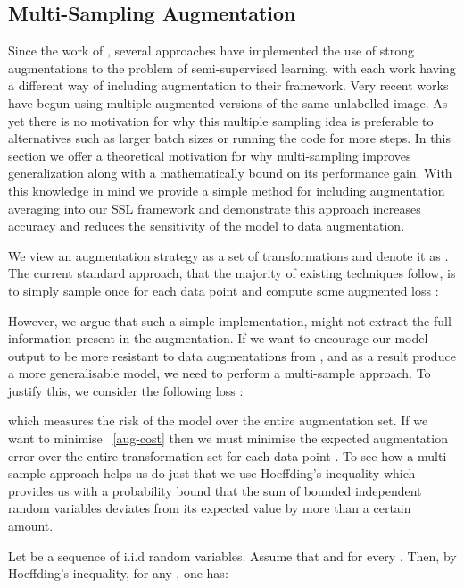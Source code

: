 \documentclass[journal]{IEEEtran}
\begin{document}
\subsection{Multi-Sampling Augmentation}
Since the work of \cite{xie2019unsupervised}, several approaches have implemented the use of strong augmentations \cite{simplepseudo,remixmatch,sohn2020fixmatch} to the problem of semi-supervised learning, with each work having a different way of including augmentation to their framework. Very recent works \cite{simplepseudo,remixmatch} have begun using multiple augmented versions of the same unlabelled image. As yet there is no motivation for why this multiple sampling idea is preferable to alternatives such as larger batch sizes or running the code for more steps. In this section we offer a theoretical motivation for why multi-sampling improves generalization along with a mathematically bound on its performance gain. With this knowledge in mind we provide a simple method for including augmentation averaging into our SSL framework and demonstrate this approach increases accuracy and reduces the sensitivity of the model to data augmentation.


We view an augmentation strategy  as a set  of transformations  and denote it as  . The current standard approach, that the majority of existing techniques follow, is to simply sample  once for each data point and compute some augmented loss :



However, we argue that such a simple implementation, might not extract the full information present in the augmentation. If we want to encourage our model output to be more resistant to data augmentations from , and as a result produce a more generalisable model, we need to perform a multi-sample approach. To justify this, we consider the following loss : 



\noindent
which measures the risk of the model over the entire augmentation set. If we want to minimise ~\eqref{aug-cost} then we must minimise the expected augmentation error over the entire transformation set for each data point . To see how a multi-sample approach helps us do just that we use Hoeffding's inequality which provides us with a probability bound that the sum of bounded independent random variables deviates from its expected value by more than a certain amount. 

Let  be a sequence of i.i.d random variables. Assume that   and  for every . Then, by Hoeffding's inequality, for any , one has:
\end{document}
